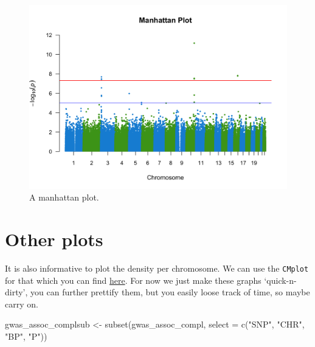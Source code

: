 \documentclass[
]{book}
\newenvironment{Shaded}{\begin{snugshade}}{\end{snugshade}}
\newcommand{\AttributeTok}[1]{\textcolor[rgb]{0.77,0.63,0.00}{#1}}
\newcommand{\FunctionTok}[1]{\textcolor[rgb]{0.00,0.00,0.00}{#1}}
\newcommand{\NormalTok}[1]{#1}
\newcommand{\OtherTok}[1]{\textcolor[rgb]{0.56,0.35,0.01}{#1}}
\newcommand{\StringTok}[1]{\textcolor[rgb]{0.31,0.60,0.02}{#1}}
\begin{document}
\begin{figure}

{\centering \includegraphics[width=18.67in]{img/_gwas/show-manhattan} 

}

\caption{A manhattan plot.}\label{fig:show-manhattan}
\end{figure}

\hypertarget{other-plots}{%
\section{Other plots}\label{other-plots}}

It is also informative to plot the density per chromosome. We can use the \texttt{CMplot} for that which you can find \href{https://github.com/YinLiLin/R-CMplot}{here}. For now we just make these graphs `quick-n-dirty', you can further prettify them, but you easily loose track of time, so maybe carry on.

\begin{Shaded}
\begin{Highlighting}[]
\NormalTok{gwas\_assoc\_complsub }\OtherTok{\textless{}{-}} \FunctionTok{subset}\NormalTok{(gwas\_assoc\_compl, }\AttributeTok{select =} \FunctionTok{c}\NormalTok{(}\StringTok{"SNP"}\NormalTok{, }\StringTok{"CHR"}\NormalTok{, }\StringTok{"BP"}\NormalTok{, }\StringTok{"P"}\NormalTok{))}
\end{Highlighting}
\end{Shaded}
\end{document}
